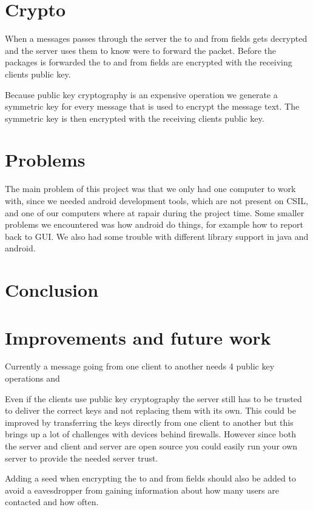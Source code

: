 \documentclass[twocolumn,11pt]{IEEEtran}
\begin{document}
 \section{Crypto}
When a messages passes through the server the to and from fields gets decrypted and the server uses them to know were to forward the packet. Before the packages is forwarded the to and from fields are encrypted with the receiving clients public key.

 Because public key cryptography is an expensive operation we generate a symmetric key for every message that is used to encrypt the message text. The symmetric key is then encrypted with the receiving clients public key. 

\section{Problems}
\label{sec:problems}
The main problem of this project was that we only had one computer to work with, since we needed android development tools, which are not present on CSIL, and one of our computers where at rapair during the project time. Some smaller problems we encountered was how android do things, for example how to report back to GUI. We also had some trouble with different library support in java and android.

\section {Conclusion}
\label{sec:conclusion}

\section {Improvements and future work}
\label{sec:improve}
Currently a message going from one client to another needs 4 public key operations and 

Even if the clients use public key cryptography the server still has to be trusted to deliver the correct keys and not replacing them with its own. This could be improved by transferring the keys directly from one client to another but this brings up a lot of challenges with devices behind firewalls. However since both the server and client and server are open source you could easily run your own server to provide the needed server trust.

Adding a seed when encrypting the to and from fields should also be added to avoid a eavesdropper from gaining information about how many users are contacted and how often. 

%
%
\end{document}
